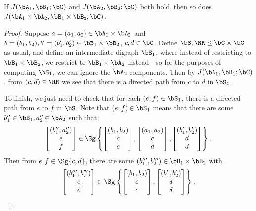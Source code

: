 \begin{lem} If $J(\bA_1,\bB_1;\bC)$ and $J(\bA_2,\bB_2;\bC)$ both hold, then so does $J(\bA_1\times \bA_2,\bB_1\times\bB_2;\bC)$.
\end{lem}
\begin{proof} Suppose $a = (a_1,a_2) \in \bA_1 \times \bA_2$ and $b = (b_1, b_2), b' = (b_1', b_2') \in \bB_1\times \bB_2$, $c,d \in \bC$. Define $\bS, \RR \le \bC \times \bC$ as usual, and define an intermediate digraph $\bS_1$, where instead of restricting to $\bB_1 \times \bB_2$, we restrict to $\bB_1 \times \bA_2$ instead - so for the purposes of computing $\bS_1$, we can ignore the $\bA_2$ components. Then by $J(\bA_1,\bB_1;\bC)$, from $(c,d) \in \RR$ we see that there is a directed path from $c$ to $d$ in $\bS_1$.

To finish, we just need to check that for each $(e,f) \in \bS_1$, there is a directed path from $e$ to $f$ in $\bS$. Note that $(e,f) \in \bS_1$ means that there are some $b_1'' \in \bB_1, a_2'' \in \bA_2$ such that
\[
\begin{bmatrix} (b_1'', a_2'')\\ e\\ f \end{bmatrix} \in \Sg\left\{\begin{bmatrix}(b_1,b_2)\\ c\\ c\end{bmatrix},\begin{bmatrix}(a_1,a_2)\\ c\\ d\end{bmatrix}, \begin{bmatrix}(b_1',b_2')\\ d\\ d\end{bmatrix}\right\}.
\]
Then from $e,f \in \Sg\{c,d\}$, there are some $(b_1''',b_2''') \in \bB_1 \times \bB_2$ with
\[
\begin{bmatrix} (b_1''', b_2''')\\ e\\ e \end{bmatrix} \in \Sg\left\{\begin{bmatrix}(b_1,b_2)\\ c\\ c\end{bmatrix}, \begin{bmatrix}(b_1',b_2')\\ d\\ d\end{bmatrix}\right\},
\]
\end{proof}
